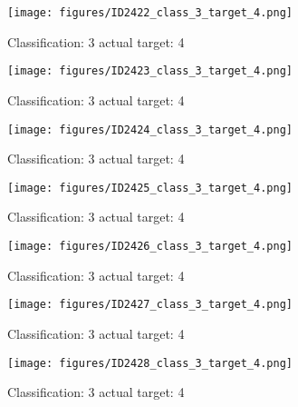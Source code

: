 \begin{figure}[h!]
\begin{center}
\texttt{[image: figures/ID2422\_class\_3\_target\_4.png]}
\end{center}
\caption{ Classification: 3 actual target: 4}
\label{fig:ID2422_class_3_target_4}
\end{figure}
\begin{figure}[h!]
\begin{center}
\texttt{[image: figures/ID2423\_class\_3\_target\_4.png]}
\end{center}
\caption{ Classification: 3 actual target: 4}
\label{fig:ID2423_class_3_target_4}
\end{figure}
\begin{figure}[h!]
\begin{center}
\texttt{[image: figures/ID2424\_class\_3\_target\_4.png]}
\end{center}
\caption{ Classification: 3 actual target: 4}
\label{fig:ID2424_class_3_target_4}
\end{figure}
\begin{figure}[h!]
\begin{center}
\texttt{[image: figures/ID2425\_class\_3\_target\_4.png]}
\end{center}
\caption{ Classification: 3 actual target: 4}
\label{fig:ID2425_class_3_target_4}
\end{figure}
\begin{figure}[h!]
\begin{center}
\texttt{[image: figures/ID2426\_class\_3\_target\_4.png]}
\end{center}
\caption{ Classification: 3 actual target: 4}
\label{fig:ID2426_class_3_target_4}
\end{figure}
\begin{figure}[h!]
\begin{center}
\texttt{[image: figures/ID2427\_class\_3\_target\_4.png]}
\end{center}
\caption{ Classification: 3 actual target: 4}
\label{fig:ID2427_class_3_target_4}
\end{figure}
\begin{figure}[h!]
\begin{center}
\texttt{[image: figures/ID2428\_class\_3\_target\_4.png]}
\end{center}
\caption{ Classification: 3 actual target: 4}
\label{fig:ID2428_class_3_target_4}
\end{figure}
